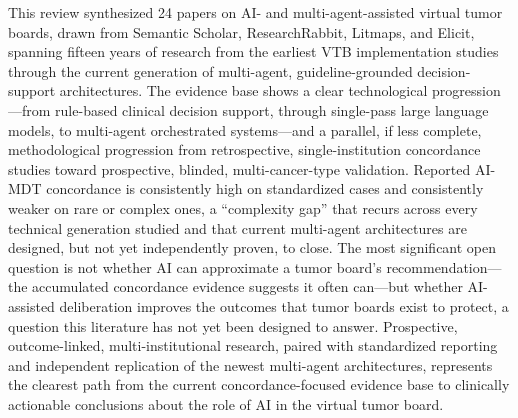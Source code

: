 \documentclass{article}
\begin{document}
This review synthesized 24 papers on AI- and multi-agent-assisted virtual tumor boards, drawn from Semantic Scholar, ResearchRabbit, Litmaps, and Elicit, spanning fifteen years of research from the earliest VTB implementation studies through the current generation of multi-agent, guideline-grounded decision-support architectures. The evidence base shows a clear technological progression---from rule-based clinical decision support, through single-pass large language models, to multi-agent orchestrated systems---and a parallel, if less complete, methodological progression from retrospective, single-institution concordance studies toward prospective, blinded, multi-cancer-type validation. Reported AI-MDT concordance is consistently high on standardized cases and consistently weaker on rare or complex ones, a ``complexity gap'' that recurs across every technical generation studied and that current multi-agent architectures are designed, but not yet independently proven, to close. The most significant open question is not whether AI can approximate a tumor board's recommendation---the accumulated concordance evidence suggests it often can---but whether AI-assisted deliberation improves the outcomes that tumor boards exist to protect, a question this literature has not yet been designed to answer. Prospective, outcome-linked, multi-institutional research, paired with standardized reporting and independent replication of the newest multi-agent architectures, represents the clearest path from the current concordance-focused evidence base to clinically actionable conclusions about the role of AI in the virtual tumor board.



\end{document}
